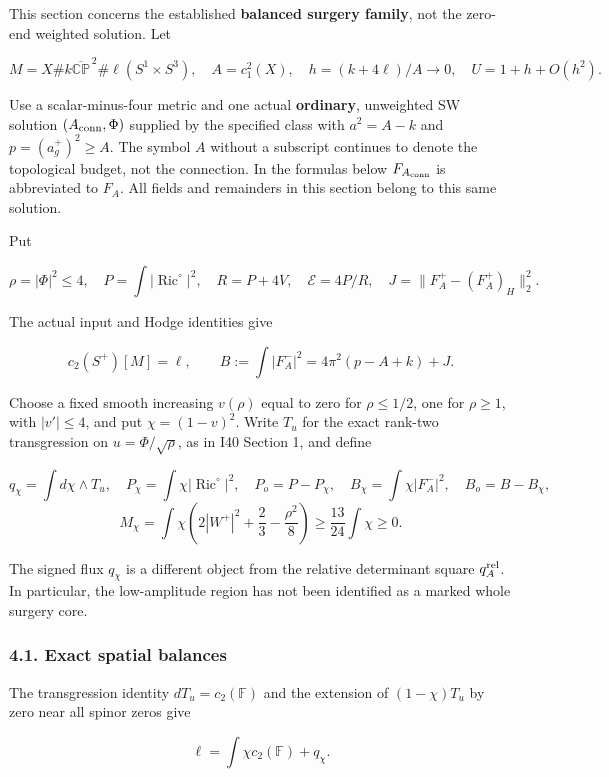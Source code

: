 \documentclass[
  11pt,
]{article}
\begin{document}
This section concerns the established \textbf{balanced surgery family},
not the zero-end weighted solution. Let

\[
 M=X\#k\overline{\mathbb {CP}}^{\,2}
       \#\ell(S^1\times S^3),\quad A=c_1^2(X),\quad
 h=(k+4\ell)/A\to0,\quad U=1+h+O(h^2).
 \tag{4.1}
\]

Use a scalar-minus-four metric and one actual \textbf{ordinary},
unweighted SW solution \((A_{\rm conn},\Phi)\) supplied by the specified
class with \(a^2=A-k\) and \(p=(a_g^+)^2\ge A\). The symbol \(A\)
without a subscript continues to denote the topological budget, not the
connection. In the formulas below \(F_{A_{\rm conn}}\) is abbreviated to
\(F_A\). All fields and remainders in this section belong to this same
solution.

Put

\[
 \rho=|\Phi|^2\le4,\quad P=\int|\operatorname{Ric}^{\circ}|^2,
 \quad R=P+4V,\quad \mathcal E=4P/R,
 \quad J=\|F_A^+-(F_A^+)_H\|_2^2.
\]

The actual input and Hodge identities give

\[
 c_2(S^+)[M]=\ell,\qquad
 B:=\int|F_A^-|^2=4\pi^2(p-A+k)+J.
 \tag{4.2}
\]

Choose a fixed smooth increasing \(v(\rho)\) equal to zero for
\(\rho\le1/2\), one for \(\rho\ge1\), with \(|v'|\le4\), and put
\(\chi=(1-v)^2\). Write \(T_u\) for the exact rank-two transgression on
\(u=\Phi/\sqrt\rho\), as in I40 Section 1, and define

\[
 q_\chi=\int d\chi\wedge T_u,\quad
 P_\chi=\int\chi|\operatorname{Ric}^{\circ}|^2,\quad P_o=P-P_\chi,
 \quad B_\chi=\int\chi|F_A^-|^2,\quad B_o=B-B_\chi,
\] \[
 M_\chi=\int\chi\left(2|W^+|^2+\frac23-\frac{\rho^2}{8}\right)
                         \ge\frac{13}{24}\int\chi\ge0.
 \tag{4.3}
\]

The signed flux \(q_\chi\) is a different object from the relative
determinant square \(q_A^{\rm rel}\). In particular, the low-amplitude
region has not been identified as a marked whole surgery core.

\hypertarget{exact-spatial-balances}{%
\subsubsection{4.1. Exact spatial
balances}\label{exact-spatial-balances}}

The transgression identity \(dT_u=c_2(\mathbb F)\) and the extension of
\((1-\chi)T_u\) by zero near all spinor zeros give

\[
 \ell=\int\chi c_2(\mathbb F)+q_\chi.
\]
\end{document}
